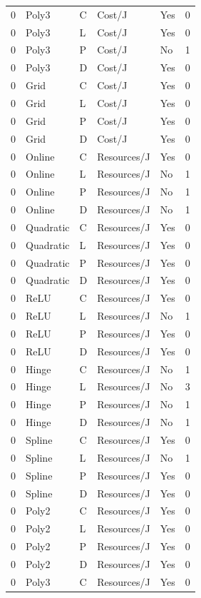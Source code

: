 \begin{longtable}{lllllr}
0 & Poly3 & C & Cost/J & Yes & 0 \\
0 & Poly3 & L & Cost/J & Yes & 0 \\
0 & Poly3 & P & Cost/J & No & 1 \\
0 & Poly3 & D & Cost/J & Yes & 0 \\
0 & Grid & C & Cost/J & Yes & 0 \\
0 & Grid & L & Cost/J & Yes & 0 \\
0 & Grid & P & Cost/J & Yes & 0 \\
0 & Grid & D & Cost/J & Yes & 0 \\
0 & Online & C & Resources/J & Yes & 0 \\
0 & Online & L & Resources/J & No & 1 \\
0 & Online & P & Resources/J & No & 1 \\
0 & Online & D & Resources/J & No & 1 \\
0 & Quadratic & C & Resources/J & Yes & 0 \\
0 & Quadratic & L & Resources/J & Yes & 0 \\
0 & Quadratic & P & Resources/J & Yes & 0 \\
0 & Quadratic & D & Resources/J & Yes & 0 \\
0 & ReLU & C & Resources/J & Yes & 0 \\
0 & ReLU & L & Resources/J & No & 1 \\
0 & ReLU & P & Resources/J & Yes & 0 \\
0 & ReLU & D & Resources/J & Yes & 0 \\
0 & Hinge & C & Resources/J & No & 1 \\
0 & Hinge & L & Resources/J & No & 3 \\
0 & Hinge & P & Resources/J & No & 1 \\
0 & Hinge & D & Resources/J & No & 1 \\
0 & Spline & C & Resources/J & Yes & 0 \\
0 & Spline & L & Resources/J & No & 1 \\
0 & Spline & P & Resources/J & Yes & 0 \\
0 & Spline & D & Resources/J & Yes & 0 \\
0 & Poly2 & C & Resources/J & Yes & 0 \\
0 & Poly2 & L & Resources/J & Yes & 0 \\
0 & Poly2 & P & Resources/J & Yes & 0 \\
0 & Poly2 & D & Resources/J & Yes & 0 \\
0 & Poly3 & C & Resources/J & Yes & 0 \\

\end{longtable}
